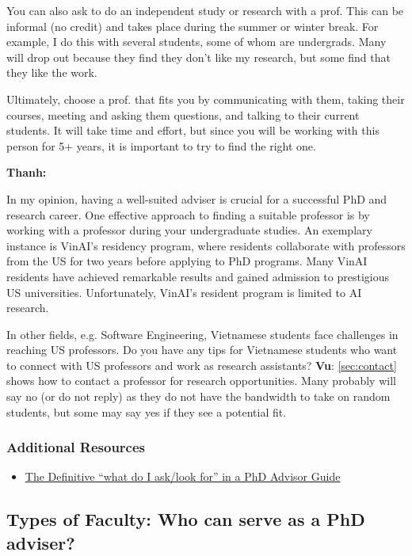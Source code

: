 \documentclass[oneside,11pt,dvipsnames]{book}
\newenvironment{commentbox}[1][]{
  \small
  \begin{mybox}
    {\small \textbf{#1}}
  }{
  \end{mybox}
}
\begin{document}
You can also ask to do an independent study or research with a prof. This can be informal (no credit) and takes place during the summer or winter break.  For example, I do this with several students, some of whom are undergrads. Many will drop out because they find they don't like my research, but some find that they like the work.

Ultimately, choose a prof. that fits you by communicating with them, taking their courses, meeting and asking them questions, and talking to their current students. It will take time and effort, but since you will be working with this person for 5+ years, it is important to try to find the right one.

\begin{commentbox}[Thanh:]
  In my opinion, having a well-suited adviser is crucial for a successful PhD and research career. One effective approach to finding a suitable professor is by working with a professor during your undergraduate studies. An exemplary instance is VinAI's residency program, where residents collaborate with professors from the US for two years before applying to PhD programs. Many VinAI residents have achieved remarkable results and gained admission to prestigious US universities. Unfortunately, VinAI's resident program is limited to AI research.

  In other fields, e.g. Software Engineering, Vietnamese students face challenges in reaching US professors. Do you have any tips for Vietnamese students who want to connect with US professors and work as research assistants?
  \tcblower
  \textbf{Vu}: \autoref{sec:contact} shows how to contact a professor for research opportunities. Many probably will say no (or do not reply) as they do not have the bandwidth to take on random students, but some may say yes if they see a potential fit.
\end{commentbox}

\subsubsection*{Additional Resources}
\begin{itemize}
  \item \href{https://www.cs.columbia.edu/wp-content/uploads/2019/03/Get-Advisor.pdf}{The Definitive ``what do I ask/look for'' in a PhD Advisor Guide}
\end{itemize}
\subsection{Types of Faculty: Who can serve as a PhD adviser?}\label{sec:faculty-types}
\end{document}
